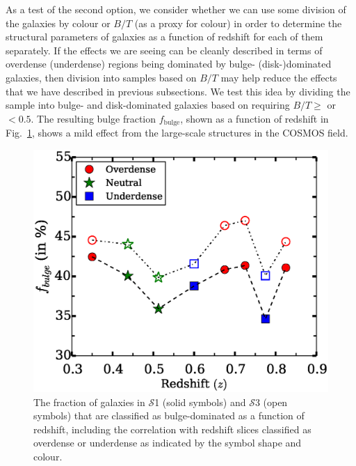 \documentclass[twocolumn,useAMS,usenatbib]{mn2e}
\newcommand{\s}{\ensuremath{\mathcal{S}}}
\begin{document}
As a test of the second option, we consider whether we can use some division of the
galaxies by colour or $B/T$ (as a proxy for colour) in order to
determine the structural parameters of galaxies as a function of
redshift for each of them separately.  If the effects we are seeing
can be cleanly described in terms of overdense (underdense) regions
being dominated by bulge- (disk-)dominated galaxies, then division
into samples based on $B/T$ may help reduce the effects that we have
described in previous subsections.  We test this idea by dividing the
sample into bulge- and disk-dominated galaxies based on requiring
$B/T\ge $ or $<0.5$.  The resulting bulge fraction $f_\text{bulge}$,
shown as a function of redshift in Fig.~\ref{fig:fbulge_z}, 
shows a mild effect from the large-scale structures in the COSMOS field.

\begin{figure}
 \centering
 \includegraphics[width=1.0\columnwidth]{fbulge_z} 
 \caption{The fraction of galaxies in \s1 (solid symbols) and
     \s3 (open symbols) that are classified as bulge-dominated as a
     function of redshift, including the correlation with redshift
     slices classified as overdense or underdense as indicated by the
     symbol shape and colour.}
 \label{fig:fbulge_z}
\end{figure}
\end{document}
